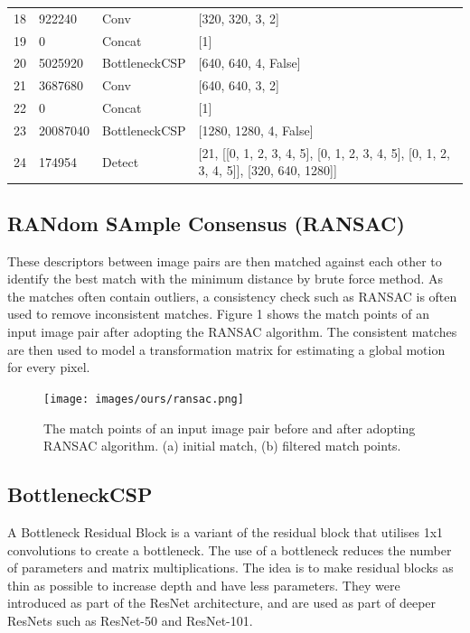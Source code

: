 \begin{table}
\begin{tabular}{p{} p{} p{} p{}}
     18 &     922240 & Conv                    &  [320, 320, 3, 2]              \\
     19 &          0 & Concat                  &  [1]                           \\
     20 &    5025920 & BottleneckCSP           &  [640, 640, 4, False]          \\
     21 &    3687680 & Conv                    &  [640, 640, 3, 2]              \\
     22 &          0 & Concat                  &  [1]                           \\
     23 &   20087040 & BottleneckCSP           &  [1280, 1280, 4, False]        \\
     24 &     174954 & Detect                  &  [21, [[0, 1, 2, 3, 4, 5], [0, 1, 2, 3, 4, 5], [0, 1, 2, 3, 4, 5]], [320, 640, 1280]] \\

\bottomrule
    \end{tabular}
  
\end{table}



\subsection{RANdom SAmple Consensus (RANSAC)}
These descriptors between image pairs are then matched against each other to identify the best match with the minimum distance by brute force method. As the matches often contain outliers, a consistency check such as RANSAC is often used to remove inconsistent matches. Figure 1 shows the match points of an input image pair after adopting the RANSAC algorithm. The consistent matches are then used to model a transformation matrix for estimating a global motion for every pixel.

\begin{figure}[ht]
    \centering
    \texttt{[image: images/ours/ransac.png]}
   \caption[ORB and RANSAC Preview]{The match points of an input image pair before and after adopting RANSAC algorithm. (a) initial match, (b) filtered match points.}
    \label{fig:ransac}
\end{figure}


\subsection{BottleneckCSP}
A Bottleneck Residual Block is a variant of the residual block that utilises 1x1 convolutions to create a bottleneck. The use of a bottleneck reduces the number of parameters and matrix multiplications. The idea is to make residual blocks as thin as possible to increase depth and have less parameters. They were introduced as part of the ResNet architecture, and are used as part of deeper ResNets such as ResNet-50 and ResNet-101.


